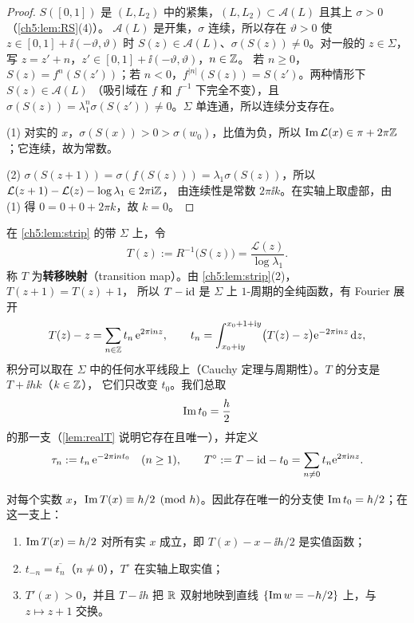 \begin{proof}
$S([0,1])$ 是 $(L,L_2)$ 中的紧集，$(L,L_2)\subset\mathcal A(L)$ 且其上 $\sigma>0$（\cref{ch5:lem:RS}(4)）。
$\mathcal A(L)$ 是开集，$\sigma$ 连续，所以存在 $\vartheta>0$ 使 $z\in[0,1]+\ii(-\vartheta,\vartheta)$ 时
$S(z)\in\mathcal A(L)$、$\sigma(S(z))\ne0$。对一般的 $z\in\Sigma$，写 $z=z'+n$，$z'\in[0,1]+\ii(-\vartheta,\vartheta)$，$n\in\mathbb{Z}$。
若 $n\ge0$，$S(z)=f^n(S(z'))$；若 $n<0$，$f^{|n|}(S(z))=S(z')$。两种情形下 $S(z)\in\mathcal A(L)$
（吸引域在 $f$ 和 $f^{-1}$ 下完全不变），且 $\sigma(S(z))=\lambda_1^{n}\sigma(S(z'))\ne0$。$\Sigma$ 单连通，所以连续分支存在。

(1) 对实的 $x$，$\sigma(S(x))>0>\sigma(w_0)$，比值为负，所以 $\operatorname{Im}\mathcal L(x)\in\pi+2\pi\mathbb{Z}$；它连续，故为常数。

(2) $\sigma(S(z+1))=\sigma(f(S(z)))=\lambda_1\sigma(S(z))$，所以 $\mathcal L(z+1)-\mathcal L(z)-\log\lambda_1\in2\pi\mathrm{i}\mathbb{Z}$，
由连续性是常数 $2\pi\ii k$。在实轴上取虚部，由 (1) 得 $0=0+0+2\pi k$，故 $k=0$。
\end{proof}

\begin{definition}[转移映射]\label{def:transition}
在 \cref{ch5:lem:strip} 的带 $\Sigma$ 上，令
\[
 T(z):=R^{-1}\bigl(S(z)\bigr)=\frac{\mathcal L(z)}{\log\lambda_1}.
\]
称 $T$ 为\textbf{转移映射}（transition map）。由 \cref{ch5:lem:strip}(2)，$T(z+1)=T(z)+1$，
所以 $T-\mathrm{id}$ 是 $\Sigma$ 上 $1$-周期的全纯函数，有 Fourier 展开
\begin{equation}\label{ch5:eq:Tfourier}
 T(z)-z=\sum_{n\in\mathbb{Z}}t_n\,\mathrm{e}^{2\pi\mathrm{i} nz},\qquad
 t_n=\int_{x_0+\mathrm{i} y}^{x_0+1+\mathrm{i} y}\bigl(T(z)-z\bigr)\mathrm{e}^{-2\pi\mathrm{i} nz}\,\mathrm{d} z ,
\end{equation}
积分可以取在 $\Sigma$ 中的任何水平线段上（Cauchy 定理与周期性）。$T$ 的分支是 $T+\ii hk$（$k\in\mathbb{Z}$），
它们只改变 $t_0$。我们总取
\begin{equation}\label{ch5:eq:branch}
 \operatorname{Im} t_0=\frac h2
\end{equation}
的那一支（\cref{lem:realT} 说明它存在且唯一），并定义
\begin{equation}\label{ch5:eq:tau}
 \tau_n:=t_n\,\mathrm{e}^{-2\pi\mathrm{i} nt_0}\quad(n\ge1),\qquad
 T^\circ:=T-\mathrm{id}-t_0=\sum_{n\ne0}t_n\mathrm{e}^{2\pi\mathrm{i} nz}.
\end{equation}
\end{definition}

\begin{lemma}[实结构]\label{lem:realT}
对每个实数 $x$，$\operatorname{Im} T(x)\equiv h/2\pmod h$。因此存在唯一的分支使 $\operatorname{Im} t_0=h/2$；在这一支上：
\begin{enumerate}
\item $\operatorname{Im} T(x)=h/2$ 对所有实 $x$ 成立，即 $T(x)-x-\ii h/2$ 是实值函数；
\item $t_{-n}=\overline{t_n}$（$n\ne0$），$T^\circ$ 在实轴上取实值；
\item $T'(x)>0$，并且 $T-\ii h$ 把 $\mathbb{R}$ 双射地映到直线 $\{\operatorname{Im} w=-h/2\}$ 上，与 $z\mapsto z+1$ 交换。
\end{enumerate}
\end{lemma}

